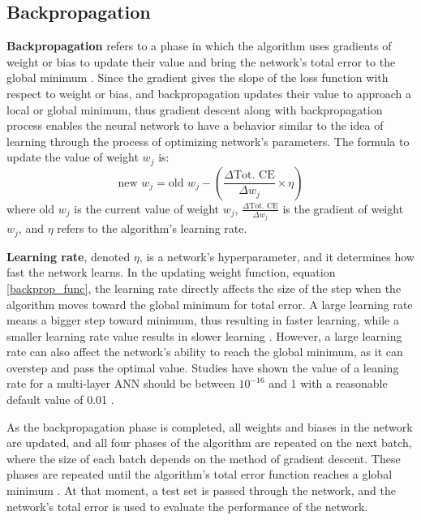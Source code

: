 \subsection{Backpropagation}
\textbf{Backpropagation} refers to a phase in which the algorithm uses gradients of weight or bias to update their value and bring the network's total error to the global minimum \cite{taylor2017neural}. Since the gradient gives the slope of the loss function with respect to weight or bias, and backpropagation updates their value to approach a local or global minimum, thus gradient descent along with backpropagation process enables the neural network to have a behavior similar to the idea of learning through the process of optimizing network's parameters. The formula to update the value of weight $w_j$ is:
%
\begin{equation} \label{backprop_func}
    \text{new } w_j = \text{old } w_j - \left( \frac{\Delta \text{Tot. CE}}{\Delta w_j} \times \eta \right)
\end{equation}
%
where old $w_j$ is the current value of weight $w_j$, $\frac{\Delta \text{Tot. CE}}{\Delta w_j}$ is the gradient of weight $w_j$, and $\eta$ refers to the algorithm's learning rate.

\textbf{Learning rate}, denoted $\eta$, is a network's hyperparameter, and it determines how fast the network learns. In the updating weight function, equation \ref{backprop_func}, the learning rate directly affects the size of the step when the algorithm moves toward the global minimum for total error. A large learning rate means a bigger step toward minimum, thus resulting in faster learning, while a smaller learning rate value results in slower learning \cite{taylor2017neural}. However, a large learning rate can also affect the network's ability to reach the global minimum, as it can overstep and pass the optimal value. Studies have shown the value of a leaning rate for a multi-layer ANN should be between $10^{-16}$ and 1 with a reasonable default value of 0.01 \cite{bengio2012practical}.

As the backpropagation phase is completed, all weights and biases in the network are updated, and all four phases of the algorithm are repeated on the next batch, where the size of each batch depends on the method of gradient descent. These phases are repeated until the algorithm's total error function reaches a global minimum \cite{taylor2017neural}. At that moment, a test set is passed through the network, and the network's total error is used to evaluate the performance of the network.